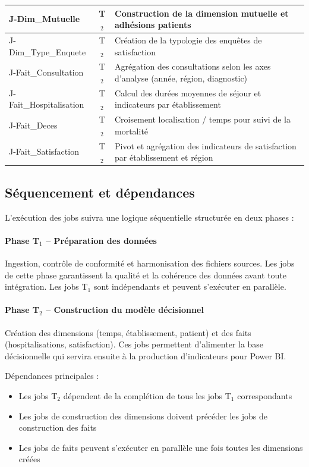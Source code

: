 \documentclass[12pt,a4paper]{article}
\begin{document}
\begin{table}[H]
\begin{tabularx}{\textwidth}{|l|c|X|}
\hline
J-Dim\_Mutuelle & T$_{2}$ & Construction de la dimension mutuelle et adhésions patients \\
\hline
J-Dim\_Type\_Enquete & T$_{2}$ & Création de la typologie des enquêtes de satisfaction \\
\hline
\hline
J-Fait\_Consultation & T$_{2}$ & Agrégation des consultations selon les axes d'analyse (année, région, diagnostic) \\
\hline
J-Fait\_Hospitalisation & T$_{2}$ & Calcul des durées moyennes de séjour et indicateurs par établissement \\
\hline
J-Fait\_Deces & T$_{2}$ & Croisement localisation / temps pour suivi de la mortalité \\
\hline
J-Fait\_Satisfaction & T$_{2}$ & Pivot et agrégation des indicateurs de satisfaction par établissement et région \\
\hline
\end{tabularx}
\end{table}

\subsection{Séquencement et dépendances}

L'exécution des jobs suivra une logique séquentielle structurée en deux phases :

\paragraph{Phase T$_{1}$ -- Préparation des données}
Ingestion, contrôle de conformité et harmonisation des fichiers sources. Les jobs de cette phase garantissent la qualité et la cohérence des données avant toute intégration. Les jobs T$_{1}$ sont indépendants et peuvent s'exécuter en parallèle.

\paragraph{Phase T$_{2}$ -- Construction du modèle décisionnel}
Création des dimensions (temps, établissement, patient) et des faits (hospitalisations, satisfaction). Ces jobs permettent d'alimenter la base décisionnelle qui servira ensuite à la production d'indicateurs pour Power BI.

Dépendances principales :
\begin{itemize}[leftmargin=*]
    \item Les jobs T$_{2}$ dépendent de la complétion de tous les jobs T$_{1}$ correspondants
    \item Les jobs de construction des dimensions doivent précéder les jobs de construction des faits
    \item Les jobs de faits peuvent s'exécuter en parallèle une fois toutes les dimensions créées
\end{itemize}
\end{document}
